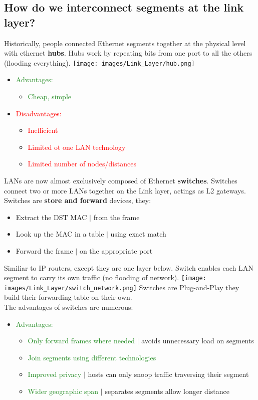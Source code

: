 \documentclass[a4paper, fontsize=8pt, landscape, DIV=1]{scrartcl}
\begin{document}
\begin{multicols*}{4}
		\subsection{How do we interconnect segments at the link layer?}
		Historically, people connected Ethernet segments together at the physical
		level with ethernet \textbf{hubs}. Hubs work by repeating bits from one port to
		all the others (flooding everything). 
		\texttt{[image: images/Link\_Layer/hub.png]}
		\begin{itemize}[noitemsep]
			\item \textcolor{ForestGreen}{Advantages:}
			\begin{itemize}
				\item \textcolor{ForestGreen}{Cheap, simple}
			\end{itemize}
			\item \textcolor{red}{Disadvantages:}
			\begin{itemize}
				\item \textcolor{red}{Inefficient}
				\item \textcolor{red}{Limited ot one LAN technology}
				\item \textcolor{red}{Limited number of nodes/distances} 
			\end{itemize} 
		\end{itemize}
		LANs are now almost exclusively composed of Ethernet \textbf{switches}.
		Switches connect two or more LANs together on the Link layer, actings as L2
		gateways. Switches are \textbf{store and forward} devices, they: 
		\begin{itemize}[noitemsep]
			\item Extract the DST MAC $\vert$ from the frame
			\item Look up the MAC in a table $\vert$ using exact match
			\item Forward the frame $\vert$ on the appropriate port
		\end{itemize}
		Similiar to IP routers, except they are one layer below. Switch enables
		each LAN segment to carry its own traffic (no flooding of network). 
		\texttt{[image: images/Link\_Layer/switch\_network.png]}
		Switches are Plug-and-Play they build their forwarding table on their
		own.\\
		The advantages of switches are numerous: 
		\begin{itemize}[noitemsep]
			\item \textcolor{ForestGreen}{Advantages:}
			\begin{itemize}
				\item \textcolor{ForestGreen}{Only forward frames where needed} $\vert$
				avoids unnecessary load on segments
				\item \textcolor{ForestGreen}{Join segments using different
					technologies}
				\item \textcolor{ForestGreen}{Improved privacy} $\vert$ hosts can only
				snoop traffic traversing their segment
				\item \textcolor{ForestGreen}{Wider geographic span} $\vert$ separates
				segments allow longer distance
			\end{itemize} 
		\end{itemize}
		\newpage
		

\end{multicols*}
\end{document}
